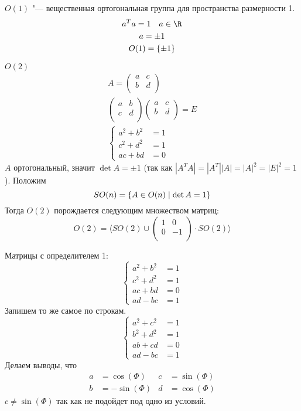 \begin{exmp}
	$O(1)$ "--- вещественная ортогональная группа для пространства размерности 1.
	\begin{gather*}
		a^T a = 1 \quad a \in \R \\
		a = \pm 1 \\
		O(1) = \{\pm 1\}
	\end{gather*}
\end{exmp}
\begin{exmp}
	$O(2)$
	\begin{gather*}
		A = \begin{pmatrix} a & c \\ b & d \\ \end{pmatrix} \\
		\begin{pmatrix} a & b \\ c & d \\ \end{pmatrix} \begin{pmatrix} a & c \\ b & d \\ \end{pmatrix} = E \\
		\left\{\begin{aligned}
			a^2 + b^2 &= 1 \\
			c^2 + d^2 &= 1 \\
			a c + b d &= 0
		\end{aligned}\right.
	\end{gather*}
	$A$ ортогональный, значит $\det A = \pm 1$ (так как $|A^TA|=|A^T||A|=|A|^2=|E|^2=1$).
	Положим
	\[
		SO(n) = \{ A \in O(n) \mid \det A = 1\} \\
	\]
	Тогда $O(2)$ порождается следующим множеством матриц:
	\[
		O(2) = \langle SO(2) \cup \begin{pmatrix} 1 & 0 \\ 0 & -1 \\ \end{pmatrix} \cdot SO(2) \rangle
	\]

	Матрицы с определителем 1:
	\[\left\{\begin{aligned}
		a^2 + b^2 &= 1 \\
		c^2 + d^2 &= 1 \\
		a c + b d &= 0 \\
		a d - b c &= 1
	\end{aligned}\right.\]
	Запишем то же самое по строкам.
	\[\left\{\begin{aligned}
		a^2 + c^2 &= 1 \\
		b^2 + d^2 &= 1 \\
		a b + c d &= 0 \\
		a d - b c &= 1
	\end{aligned}\right.\]
	Делаем выводы, что
	\begin{align*}
		a &=  \cos(\Phi) & c &= \sin(\Phi) \\
		b &= -\sin(\Phi) & d &= \cos(\Phi)
	\end{align*}
	$c \ne \sin(\Phi)$ так как не подойдет под одно из условий.


\end{exmp}
